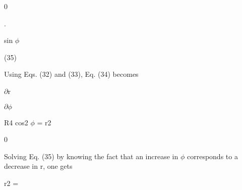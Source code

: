 \documentclass[a4paper,portrait,12pt]{article}
\begin{document}
\newpage



0 \newpage



\newpage



\newpage
 .


\newpage



\begin{flushleft}
sin $\phi$ \newpage

\end{flushleft}





(35)





\begin{flushleft}
Using Eqs. (32) and (33), Eq. (34) becomes
\end{flushleft}


\begin{flushleft}
\newpage
 $\partial$r
\end{flushleft}


\newpage



\newpage



\begin{flushleft}
\newpage
 $\partial$$\phi$
\end{flushleft}


\begin{flushleft}
R4 cos2 $\phi$ = r2 \newpage

\end{flushleft}


\newpage








0





\begin{flushleft}
Solving Eq. (35) by knowing the fact that an increase in $\phi$ corresponds to a decrease in r, one gets
\end{flushleft}


\begin{flushleft}
r2 =
\end{flushleft}
\end{document}
